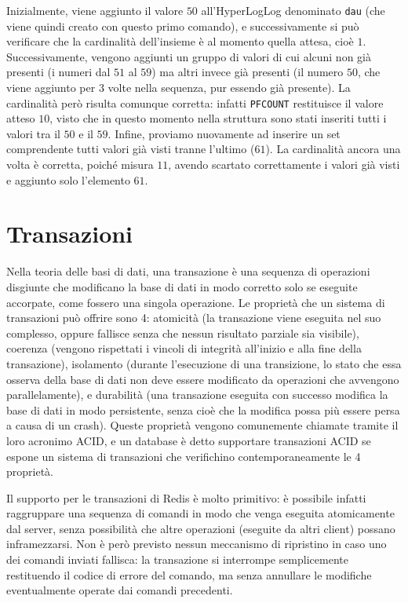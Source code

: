 Inizialmente, viene aggiunto il valore $50$ all'HyperLogLog denominato \verb|dau| (che viene quindi
creato con questo primo comando), e successivamente si può verificare che la cardinalità
dell'insieme è al momento quella attesa, cioè $1$. Successivamente, vengono aggiunti un gruppo di
valori di cui alcuni non già presenti (i numeri dal $51$ al $59$) ma altri invece già presenti (il
numero $50$, che viene aggiunto per 3 volte nella sequenza, pur essendo già presente). La cardinalità
però risulta comunque corretta: infatti \verb|PFCOUNT| restituisce il valore atteso $10$, visto che in
questo momento nella struttura sono stati inseriti tutti i valori tra il $50$ e il $59$. Infine,
proviamo nuovamente ad inserire un set comprendente tutti valori già visti tranne l'ultimo ($61$). La
cardinalità ancora una volta è corretta, poiché misura $11$, avendo scartato correttamente i valori
già visti e aggiunto solo l'elemento $61$.

\section{Transazioni}

Nella teoria delle basi di dati, una transazione è una sequenza di operazioni disgiunte che
modificano la base di dati in modo corretto solo se eseguite accorpate, come fossero una singola
operazione. Le proprietà che un sistema di transazioni può offrire sono 4: atomicità (la transazione
viene eseguita nel suo complesso, oppure fallisce senza che nessun risultato parziale sia visibile),
coerenza (vengono rispettati i vincoli di integrità all'inizio e alla fine della transazione),
isolamento (durante l'esecuzione di una transizione, lo stato che essa osserva della base di dati
non deve essere modificato da operazioni che avvengono parallelamente), e durabilità (una
transazione eseguita con successo modifica la base di dati in modo persistente, senza cioè che la
modifica possa più essere persa a causa di un crash). Queste proprietà vengono comunemente chiamate
tramite il loro acronimo ACID, e un database è detto supportare transazioni ACID se espone un
sistema di transazioni che verifichino contemporaneamente le 4 proprietà.

Il supporto per le transazioni di Redis è molto primitivo: è possibile infatti raggruppare
una sequenza di comandi in modo che venga eseguita atomicamente dal server, senza possibilità che
altre operazioni (eseguite da altri client) possano inframezzarsi. Non è però previsto nessun
meccanismo di ripristino in caso uno dei comandi inviati fallisca: la transazione si interrompe
semplicemente restituendo il codice di errore del comando, ma senza annullare le modifiche
eventualmente operate dai comandi precedenti.


